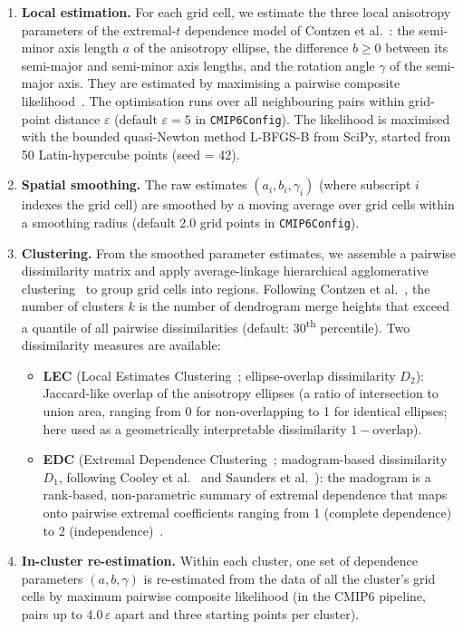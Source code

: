 \documentclass[preprint,12pt,a4paper]{elsarticle}
\newcommand{\rev}[1]{{#1}}
\newcommand{\revo}[1]{{#1}}
\newcommand{\revt}[1]{{#1}}
\begin{document}
\begin{enumerate}
  regular grid by the spectral construction of
  Schlather~\cite{schlather2002}, with the positive parts of
  Gaussian spectral functions raised to the power~$\nu$, the degrees
  of freedom of the extremal-$t$ model, as in Opitz~\cite{opitz2013}.
\item \textbf{Local estimation.}
  For each grid cell, we estimate the three local anisotropy
  parameters of the extremal-$t$ dependence model of Contzen
  et al.~\cite{contzen2025,opitz2013}: the semi-minor axis length $a$
  of the anisotropy ellipse, the difference $b \ge 0$ between its
  semi-major and semi-minor axis lengths, and the rotation angle $\gamma$ of the
  semi-major axis. They are estimated by
  maximising a pairwise composite likelihood~\cite{padoan2010,contzen2025}. The
  optimisation runs over all neighbouring pairs within grid-point
  distance $\varepsilon$ (default $\varepsilon=5$ in \texttt{CMIP6Config}).
  \rev{The likelihood is maximised with the bounded quasi-Newton method
  L-BFGS-B from SciPy, started from 50 Latin-hypercube points
  (seed = 42).}
\item \textbf{\rev{Spatial smoothing.}}
  \rev{The raw estimates $(a_i, b_i, \gamma_i)$ \revt{(where
  subscript $i$ indexes the grid cell)} are smoothed by a
  moving average over grid cells within a smoothing radius (default
  2.0 grid points in \texttt{CMIP6Config}).}
\item \textbf{Clustering.}
  From the smoothed parameter estimates, we assemble a pairwise
  dissimilarity matrix and apply average-linkage hierarchical
  agglomerative clustering~\cite{contzen2025} to group grid cells into regions.
  Following Contzen et al.~\cite{contzen2025}, the number of
  clusters $k$ is the number of dendrogram merge heights that exceed
  a quantile of all pairwise dissimilarities (default:
  30\textsuperscript{th} percentile).
  Two dissimilarity measures are available:
  \begin{itemize}
  \item \textbf{LEC} (Local Estimates Clustering~\cite{contzen2025}; ellipse-overlap
    dissimilarity $D_2$): Jaccard-like overlap of the anisotropy
    ellipses\revo{ (a ratio of intersection to union area, ranging
    from 0 for non-overlapping to 1 for identical ellipses; here
    used as a geometrically interpretable dissimilarity $1 - \text{overlap}$)}.
  \item \textbf{EDC} (Extremal Dependence Clustering~\cite{contzen2025}; madogram-based
    dissimilarity $D_1$, following Cooley et al.~\cite{cooley2006} and Saunders et al.~\cite{saunders2021}):
    \revo{the madogram is a rank-based, non-parametric summary of
    extremal dependence that maps onto pairwise extremal coefficients
    ranging from 1 (complete dependence) to 2
    (independence)~\cite{cooley2006}.}
  \end{itemize}
\item \textbf{\rev{In-cluster re-estimation.}}
  \rev{Within each cluster, one set of dependence parameters
  $(a,b,\gamma)$ is re-estimated from the data of all the cluster's
  grid cells by maximum pairwise composite likelihood (in the CMIP6
  pipeline, pairs up to $4.0\,\varepsilon$ apart and three starting
  points per cluster).}
\end{enumerate}
\end{document}

